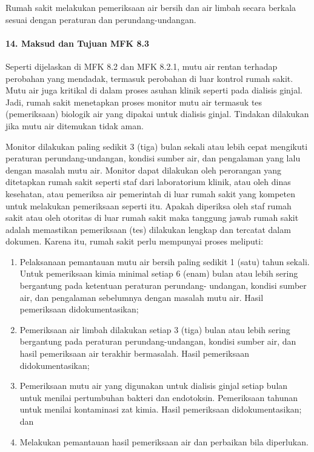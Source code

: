 \documentclass[
]{book}
\providecommand{\tightlist}{%
  \setlength{\itemsep}{0pt}\setlength{\parskip}{0pt}}
\begin{document}
Rumah sakit melakukan pemeriksaan air bersih dan air limbah secara berkala sesuai dengan peraturan dan perundang-undangan.

\hypertarget{maksud-dan-tujuan-mfk-8.3}{%
\paragraph*{14. Maksud dan Tujuan MFK 8.3}\label{maksud-dan-tujuan-mfk-8.3}}

Seperti dijelaskan di MFK 8.2 dan MFK 8.2.1, mutu air rentan terhadap perobahan yang mendadak, termasuk perobahan di luar kontrol rumah sakit. Mutu air juga kritikal di dalam proses asuhan klinik seperti pada dialisis ginjal. Jadi, rumah sakit menetapkan proses monitor mutu air termasuk tes (pemeriksaan) biologik air yang dipakai untuk dialisis ginjal. Tindakan dilakukan jika mutu air ditemukan tidak aman.

Monitor dilakukan paling sedikit 3 (tiga) bulan sekali atau lebih cepat mengikuti peraturan perundang-undangan, kondisi sumber air, dan pengalaman yang lalu dengan masalah mutu air. Monitor dapat dilakukan oleh perorangan yang ditetapkan rumah sakit seperti staf dari laboratorium klinik, atau oleh dinas kesehatan, atau pemeriksa air pemerintah di luar rumah sakit yang kompeten untuk melakukan pemeriksaan seperti itu. Apakah diperiksa oleh staf rumah sakit atau oleh otoritas di luar rumah sakit maka tanggung jawab rumah sakit adalah memastikan pemeriksaan (tes) dilakukan lengkap dan tercatat dalam dokumen.
Karena itu, rumah sakit perlu mempunyai proses meliputi:

\begin{enumerate}
\def\labelenumi{\alph{enumi}.}
\tightlist
\item
  Pelaksanaan pemantauan mutu air bersih paling sedikit 1 (satu) tahun sekali. Untuk pemeriksaan kimia minimal setiap 6 (enam) bulan atau lebih sering bergantung pada ketentuan peraturan perundang- undangan, kondisi sumber air, dan pengalaman sebelumnya dengan masalah mutu air. Hasil pemeriksaan didokumentasikan;
\item
  Pemeriksaan air limbah dilakukan setiap 3 (tiga) bulan atau lebih sering bergantung pada peraturan perundang-undangan, kondisi sumber air, dan hasil pemeriksaan air terakhir bermasalah. Hasil pemeriksaan didokumentasikan;
\item
  Pemeriksaan mutu air yang digunakan untuk dialisis ginjal setiap bulan untuk menilai pertumbuhan bakteri dan endotoksin. Pemeriksaan tahunan untuk menilai kontaminasi zat kimia. Hasil pemeriksaan didokumentasikan; dan
\item
  Melakukan pemantauan hasil pemeriksaan air dan perbaikan bila diperlukan.
\end{enumerate}
\end{document}
